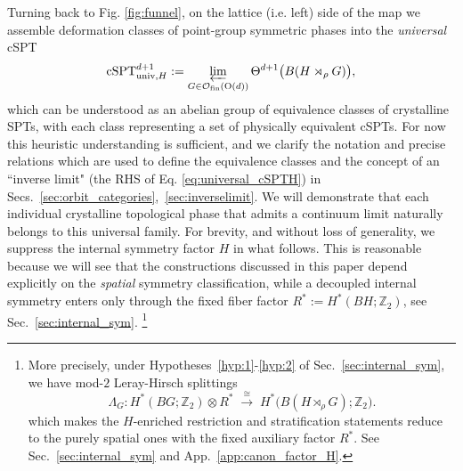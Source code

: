 \documentclass[aps,prx,reprint,superscriptaddress,twocolumn,amsmath,amssymb,amsfonts, nofootinbib]{revtex4-2}
\newcommand{\On}{\text{O}}
\theoremstyle{apsstyle}
\begin{document}
Turning back to Fig. \ref{fig:funnel}, on the lattice (i.e. left) side of the map we assemble deformation classes of point-group symmetric phases into the \emph{universal} cSPT
\begin{equation}
\mathrm{cSPT}^{d+1}_{\mathrm{univ}, H}
:= \varprojlim_{G\in \mathcal{O}_{\mathrm{fin}}(\On(d))}\Theta^{d+1}\bigl(B(H\rtimes_{\rho} G)\bigr),
\label{eq:universal_cSPTH}
\end{equation}
which can be understood as an abelian group of equivalence classes of crystalline SPTs, with each class representing a set of physically equivalent cSPTs. For now this heuristic understanding is sufficient, and we clarify the notation and precise relations which are used to define the equivalence classes and the concept of an ``inverse limit" (the RHS of Eq. \ref{eq:universal_cSPTH}) in Secs.~\ref{sec:orbit_categories},~\ref{sec:inverselimit}. We will demonstrate that each individual crystalline topological phase that admits a continuum limit naturally belongs to this universal family. For brevity, and without loss of generality, we suppress the internal symmetry factor $H$ in what follows. This is reasonable because we will see that the constructions discussed in this paper depend explicitly on the \emph{spatial} symmetry classification, while a decoupled internal symmetry enters only through the fixed fiber factor $R^{*}:=H^{*}(BH;\mathbb Z_{2})$, see Sec.~\ref{sec:internal_sym}.
\footnote{More precisely, under Hypotheses~\ref{hyp:1}-\ref{hyp:2} of Sec.~\ref{sec:internal_sym}, we have mod-$2$ Leray-Hirsch splittings
\[
\Lambda_{G}: H^{*}(BG;\mathbb Z_{2})\otimes R^{*}
\;\xrightarrow{\;\cong\;}\;
H^{*}\bigl(B(H\rtimes_{\rho}G);\mathbb Z_{2}\bigr).
\]
which makes the $H$-enriched restriction and stratification statements reduce to the purely spatial ones with the fixed auxiliary factor $R^{*}$. See Sec.~\ref{sec:internal_sym} and App.~\ref{app:canon_factor_H}.}
\end{document}
